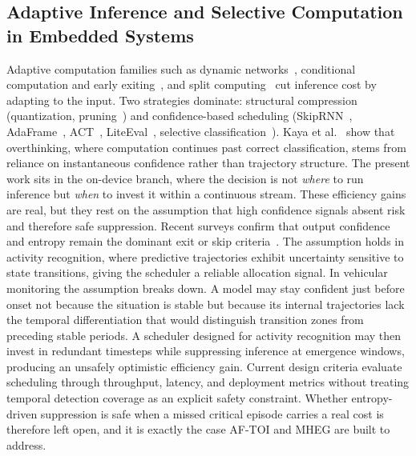 \documentclass[a4paper,fleqn]{cas-dc}
\newcommand{\AFTOI}{\mbox{AF-TOI}\xspace}
\newcommand{\MHEG}{\mbox{MHEG}\xspace}
\begin{document}
\subsection{Adaptive Inference and Selective Computation in Embedded Systems}
\label{sec:rel_edgeai}
Adaptive computation families such as dynamic networks~\cite{han2022dynamic,montello2025dynamic}, conditional computation and early exiting~\cite{scardapane2024conditional,rahmath2024earlyexit,teerapittayanon2016branchynet,laskaridis2021adaptive}, and split computing~\cite{matsubara2022split,laskaridis2020hapi} cut inference cost by adapting to the input. Two strategies dominate: structural compression (quantization, pruning~\cite{hariharan2023driveredge}) and confidence-based scheduling (SkipRNN~\cite{campos2018skip}, AdaFrame~\cite{wu2019adaframe}, ACT~\cite{graves2016adaptive}, LiteEval~\cite{wu2019liteeval}, selective classification~\cite{geifman2017selective}). Kaya et al.~\cite{kaya2019shallow} show that overthinking, where computation continues past correct classification, stems from reliance on instantaneous confidence rather than trajectory structure. The present work sits in the on-device branch, where the decision is not \emph{where} to run inference but \emph{when} to invest it within a continuous stream.
These efficiency gains are real, but they rest on the assumption that high
confidence signals absent risk and therefore safe suppression. Recent surveys
confirm that output confidence and entropy remain the dominant exit or skip
criteria~\cite{rahmath2024earlyexit}. The assumption holds in activity
recognition, where predictive trajectories exhibit uncertainty sensitive to
state transitions, giving the scheduler a reliable allocation signal.
In vehicular monitoring the assumption breaks down. A model may stay confident
just before onset not because the situation is stable but because its internal
trajectories lack the temporal differentiation that would distinguish
transition zones from preceding stable periods. A scheduler designed for
activity recognition may then invest in redundant timesteps while suppressing
inference at emergence windows, producing an unsafely optimistic efficiency
gain. Current design criteria evaluate scheduling through throughput, latency,
and deployment metrics without treating temporal detection coverage as an
explicit safety constraint. Whether entropy-driven suppression is safe when a
missed critical episode carries a real cost is therefore left open, and it is
exactly the case \AFTOI and \MHEG are built to address.
\end{document}

